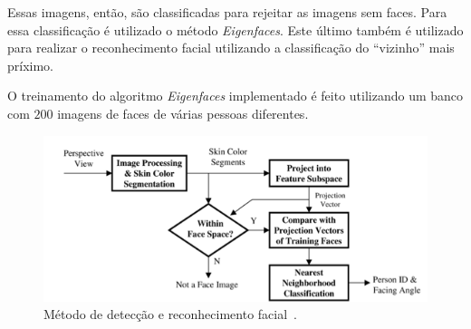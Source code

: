 Essas imagens, então, são classificadas para rejeitar as imagens sem faces. Para essa classificação é utilizado o método \textit{Eigenfaces}. Este último também é utilizado para realizar o reconhecimento facial utilizando a classificação do ``vizinho'' mais príximo.

O treinamento do algoritmo \textit{Eigenfaces} implementado é feito utilizando um banco com $\displaystyle 200$ imagens de faces de várias pessoas diferentes.

	\begin{figure}[hbt]
		\begin{center}
			\includegraphics[scale=0.8]{figuras/3.TrabalhosCorrelatos/facerec.png}
		\end{center}
		\caption{Método de detecção e reconhecimento facial~\cite{trivedi}.}
		\label{facerec}
	\end{figure}

